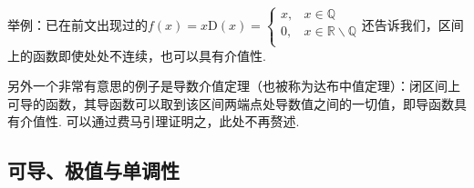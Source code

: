 \begin{enumerate}[label={(\arabic*)}]
      举例：已在前文出现过的$f\left( x \right) =x\text{D}\left( x \right) =\begin{cases}
        x,&   x\in \mathbb{Q}\\
        0, &    x\in \mathbb{R}\backslash\mathbb{Q}\\
      \end{cases}$还告诉我们，区间上的函数即使处处不连续，也可以具有介值性.

      另外一个非常有意思的例子是导数介值定理（也被称为达布中值定理）：闭区间上可导的函数，其导函数可以取到该区间两端点处导数值之间的一切值，即导函数具有介值性. 可以通过费马引理证明之，此处不再赘述.
    \end{enumerate}

  \subsection{可导、极值与单调性}
